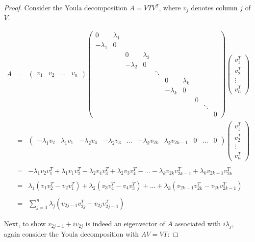 \documentclass[a4,11pt,twoside,leqno]{report}
\theoremstyle{definition}
\theoremstyle{remark}
\numberwithin{equation}{section}
\begin{document}
\begin{proof}

Consider the Youla decomposition $A=VTV^T$, where $v_j$ denotes column $j$ of $V$. 

$$\begin{array}{lcl} A &=& \begin{pmatrix} v_1 & v_2 & \dots & v_n \end{pmatrix} \begin{pmatrix} 0 & \lambda_1\\ -\lambda_1 & 0 \\ &  & 0 & \lambda_2 \\ & & -\lambda_2 & 0 \\ & & & & \ddots \\ & & & & & 0 & \lambda_k \\ & & &  & & -\lambda_k & 0 \\ & & & & & & & 0 \\ & & & & & & & & \ddots \\ & & &  & & & &  & & 0  \end{pmatrix} \begin{pmatrix} v_1^T \\ v_2^T \\ \vdots \\ v_n^T \end{pmatrix} \\ &=& \begin{pmatrix} -\lambda_1v_2 & \lambda_1v_1 & -\lambda_2v_4 & -\lambda_2v_3 &\dots & -\lambda_kv_{2k} & \lambda_kv_{2k-1} & 0 & \dots & 0  \end{pmatrix} \begin{pmatrix} v_1^T \\ v_2^T \\ \vdots \\ v_n^T \end{pmatrix} \\ \\ &=& -\lambda_1v_2v_1^T+\lambda_1v_1v_2^T-\lambda_2v_4v_3^T+\lambda_2v_3v_4^T -\dots-\lambda_kv_{2k}v_{2k-1}^T+\lambda_kv_{2k-1}v_{2k}^T \\ \\ &=& \lambda_1(v_1v_2^T-v_2v_1^T)+\lambda_2(v_3v_4^T-v_4v_3^T)+\dots+\lambda_k(v_{2k-1}v_{2k}^T-v_{2k}v_{2k-1}^T) \\ \\ &=& \displaystyle \sum_{j=1}^n \lambda_j(v_{2j-1}v_{2j}^T-v_{2j}v_{2j-1}^T) \end{array}$$

Next, to show $v_{2j-1}+iv_{2j}$ is indeed an eigenvector of $A$ associated with $i\lambda_j$, again consider the Youla decomposition with $AV=VT$:


\end{proof}
\end{document}
